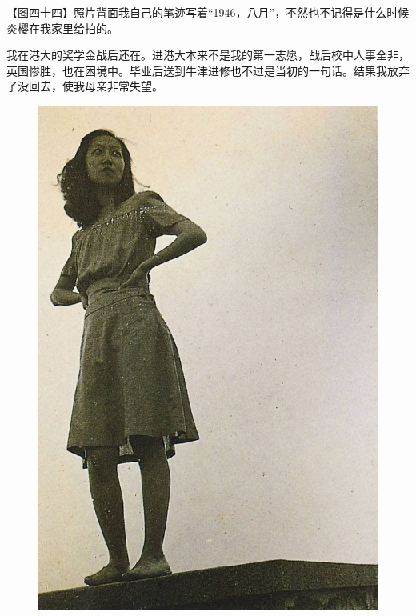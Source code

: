 \clearpage
\par 【图四十四】照片背面我自己的笔迹写着“1946，八月”，不然也不记得是什么时候炎樱在我家里给拍的。
\par 我在港大的奖学金战后还在。进港大本来不是我的第一志愿，战后校中人事全非，英国惨胜，也在困境中。毕业后送到牛津进修也不过是当初的一句话。结果我放弃了没回去，使我母亲非常失望。
\begin{figure}[htb]
    \centering %
    \includegraphics[scale=0.4]{picture/对照记44.jpeg}
\end{figure}


